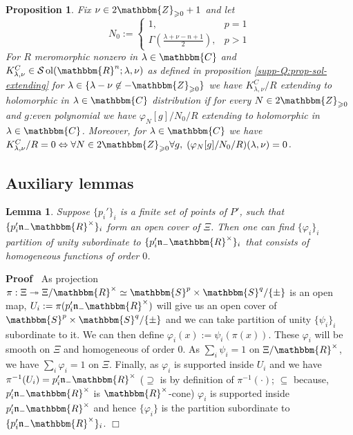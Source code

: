 \documentclass{article}
\newcommand{\assign}{:=}
\newcommand{\nin}{\not\in}
\newcommand{\tmop}[1]{\ensuremath{\operatorname{#1}}}
\newenvironment{proof}{\noindent\textbf{Proof\ }}{\hspace*{\fill}$\Box$\medskip}
\numberwithin{definition}{section}
\newtheorem{lemma}{Lemma}
\numberwithin{lemma}{section}
\newtheorem{proposition}{Proposition}
\numberwithin{proposition}{section}
{\theorembodyfont{\rmfamily}\newtheorem{remark}{Remark}
\numberwithin{remark}{section}
}
\begin{document}
\begin{proposition}
  \label{k-finite:prop-KC-hook-wrap}Fix $\nu \in 2\mathbbm{Z}_{\geqslant 0} +
  1$ and let
  \[ N_0 \assign \left\{ \begin{array}{ll}
       1, & p = 1\\
       \Gamma \left( \frac{\lambda + \nu - n + 1}{2} \right), & p > 1
     \end{array} \right. \]
  For $R$ meromorphic nonzero in $\lambda \in \mathbbm{C}$ and $K_{\lambda,
  \nu}^C \in \mathcal{S} \tmop{ol} ( \mathbbm{R}^n ; \lambda, \nu)$ as defined
  in proposition \ref{supp-Q:prop-sol-extending} for $\lambda \in \{ \lambda -
  \nu \nin -\mathbbm{Z}_{\geqslant 0} \}$ we have $K_{\lambda, \nu}^C / R$
  extending to holomorphic in $\lambda \in \mathbbm{C}$ distribution if for
  every $N \in 2\mathbbm{Z}_{\geqslant 0}$ and $g$:even polynomial we have
  $\varphi_N [ g] / N_0 / R$ extending to holomorphic in $\lambda \in
  \mathbbm{C}$. Moreover, for $\lambda \in \mathbbm{C}$ we have $K_{\lambda,
  \nu}^C / R = 0 \Leftrightarrow \forall N \in 2\mathbbm{Z}_{\geqslant 0}
  \forall g, \; ( \varphi_N [ g] / N_0 / R) ( \lambda, \nu) = 0$.
\end{proposition}

\subsection{Auxiliary lemmas}

\begin{lemma}
  \label{k-finite:lem-good-cover}Suppose $\{ p_i' \}_i$ is a finite set of
  points of $P'$, such that $\{ p'_i \mathfrak{n}_- \mathbbm{R}^{\times} \}_i$
  form an open cover of $\Xi$. Then one can find $\{ \varphi_i \}_i$ partition
  of unity subordinate to $\{ p'_i \mathfrak{n}_- \mathbbm{R}^{\times} \}_i$
  that consists of homogeneous functions of order $0$.
\end{lemma}

\begin{proof}
  As projection $\pi : \Xi \twoheadrightarrow \Xi /\mathbbm{R}^{\times} \simeq
  \mathbbm{S}^p \times \mathbbm{S}^q / \{ \pm \}$ is an open map, $U_i \assign
  \pi ( p_i' \mathfrak{n}_- \mathbbm{R}^{\times})$ will give us an open cover
  of $\mathbbm{S}^p \times \mathbbm{S}^q / \{ \pm \}$ and we can take
  partition of unity $\{ \psi_i \}_i$ subordinate to it. We can then define
  $\varphi_i ( x) \assign \psi_i ( \pi ( x))$. These $\varphi_i$ will be
  smooth on $\Xi$ and homogeneous of order 0. As $\sum_i \psi_i = 1$ on $\Xi
  /\mathbbm{R}^{\times}$, we have $\sum_i \varphi_i = 1$ on $\Xi$. Finally, as
  $\varphi_i$ is supported inside $U_i$ and we have $\pi^{- 1} ( U_i) = p_i'
  \mathfrak{n}_- \mathbbm{R}^{\times}$ ($\supseteq$ is by definition of
  $\pi^{- 1} ( \cdot)$; $\subseteq$ because, $p_i' \mathfrak{n}_-
  \mathbbm{R}^{\times}$ is $\mathbbm{R}^{\times}$-cone) $\varphi_i$ is
  supported inside $p_i' \mathfrak{n}_- \mathbbm{R}^{\times}$ and hence $\{
  \varphi_i \}$ is the partition subordinate to $\{ p'_i \mathfrak{n}_-
  \mathbbm{R}^{\times} \}_i$.
\end{proof}
\end{document}
